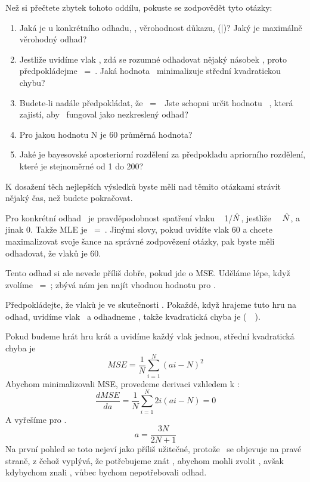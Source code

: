 \documentclass[12pt]{book}
\begin{document}
Než si přečtete zbytek tohoto oddílu, pokuste se zodpovědět tyto otázky:

\begin{enumerate}

\item Jaká je u konkrétního odhadu, \mynhat, věrohodnost důkazu, \Prob(\E|\mynhat)?  Jaký je maximálně věrohodný odhad?

\item Jestliže uvidíme vlak \ii, zdá se rozumné odhadovat nějaký násobek \ii, proto předpokládejme \mynhat~=~\mya \ii.  Jaká hodnota \mya~minimalizuje střední kvadratickou chybu?

\item Budete-li nadále předpokládat, že \mynhat~=~\mya \ii~Jste schopni určit hodnotu \
\mya, která zajistí, aby \mynhat~fungoval jako nezkreslený odhad?
\index{nezkreslený odhad}

\item Pro jakou hodnotu N je 60 průměrná hodnota?

\item Jaké je bayesovské aposteriorní rozdělení za předpokladu apriorního rozdělení, které je stejnoměrné od 1
do 200?

\end{enumerate}

K dosažení těch nejlepších výsledků byste měli nad těmito otázkami strávit nějaký čas, než budete pokračovat.

Pro konkrétní odhad \mynhat~je pravděpodobnost spatření vlaku \ii~
1/$\hat{N}$, jestliže \ii~\myle~$\hat{N}$, a jinak 0.  Takže MLE je
\mynhat~=~\ii.
Jinými slovy, pokud uvidíte vlak 60 a chcete maximalizovat svoje šance na správné zodpovězení otázky, pak byste měli odhadovat, že vlaků je 60.

Tento odhad si ale nevede příliš dobře, pokud jde o MSE.  Uděláme lépe, když zvolíme \mynhat~=~\mya\ii; zbývá nám jen najít vhodnou hodnotu pro \mya.

Předpokládejte, že vlaků je ve skutečnosti \N.  Pokaždé, když hrajeme tuto hru na odhad, uvidíme vlak
\ii~a odhadneme \mya\ii, takže kvadratická chyba je
(\mya\ii~\minus~\N).

Pokud budeme hrát hru \N krát a uvidíme každý vlak jednou, střední kvadratická chyba je
%
\[ MSE = \frac{1}{N} \sum_{i=1}^N (ai - N)^2 \]
%
Abychom minimalizovali MSE, provedeme derivaci vzhledem k \mya:
%
\[ \frac{d MSE}{da} = \frac{1}{N} \sum_{i=1}^N 2i (ai - N) = 0 \]
%
A vyřešíme pro \mya.
%
\[ a = \frac{3N}{2N+1} \]
%
Na první pohled se toto nejeví jako příliš užitečné, protože \N~se objevuje na pravé straně, z čehož vyplývá, že potřebujeme znát \N, abychom mohli zvolit \mya, avšak kdybychom znali \N, vůbec bychom nepotřebovali odhad.
\end{document}
